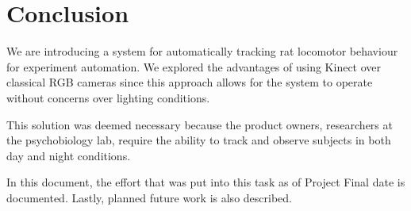 \chapter{Conclusion}
We are introducing a system for automatically tracking rat locomotor behaviour for experiment automation. We explored the advantages of using Kinect over classical RGB cameras since this approach allows for the system to operate without concerns over lighting conditions. 

This solution was deemed necessary because the product owners, researchers at the psychobiology lab, require the ability to track and observe subjects in both day and night conditions.

In this document, the effort that was put into this task as of Project Final date is documented. Lastly, planned future work is also described.
